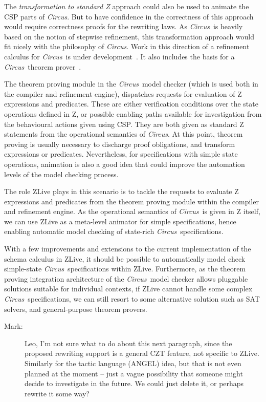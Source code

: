 \documentclass{llncs}
\newcommand{\Circus}{{\sf\slshape Circus}}
\begin{document}
    The \emph{transformation to standard Z} approach could also be
    used to animate the CSP parts of \Circus.  But to have confidence
    in the correctness of this approach would require correctness proofs
    for the rewriting laws.
    As \Circus\ is heavily based on the notion of stepwise refinement,
    this transformation approach would fit nicely with the philosophy of \Circus.
    Work in this direction of a refinement calculus for \Circus\ is under
    development~\cite{circus.ref:marcel}. It also includes the basis for a
    \Circus\ theorem prover~\cite{circus.sem:pp}.

    The theorem proving module in the \Circus\ model checker (which is
    used both in the compiler and refinement engine), dispatches
    requests for evaluation of Z expressions and predicates. These are
    either verification conditions over the state operations defined
    in Z, or possible enabling paths available for investigation from
    the behavioural actions given using CSP.  They are both given as
    standard Z statements from the operational semantics of \Circus.
    At this point, theorem proving is usually necessary to discharge
    proof obligations, and transform expressions or
    predicates. Nevertheless, for specifications with simple state
    operations, animation is also a good idea that could improve the
    automation levels of the model checking process.

    The role ZLive plays in this scenario is to tackle the requests to
    evaluate Z expressions and predicates from the theorem proving module
    within the compiler and refinement engine.  As the operational semantics of
    \Circus\ is given in Z itself, we can use ZLive as a meta-level
    animator for simple specifications, hence enabling automatic model
    checking of state-rich \Circus\ specifications.

    With a few improvements and extensions to the current implementation of
    the schema calculus in ZLive, it should be possible to automatically
    model check simple-state \Circus\ specifications within ZLive.
    Furthermore, as the theorem proving integration architecture of the
    \Circus\ model checker allows pluggable solutions suitable for individual
    contexts, if ZLive cannot handle some complex \Circus\ specifications,
    we can still resort to some alternative solution such as SAT solvers,
    and general-purpose theorem provers.

    \begin{description}
    \item[Mark:] Leo, I'm not sure what to do about this next paragraph, since
    the proposed rewriting support is a general CZT feature, not specific
    to ZLive.  Similarly for the tactic language (ANGEL) idea, but that
    is not even planned at the moment -- just a vague possibility that 
    someone might decide to investigate in the future.  We could just
    delete it, or perhaps rewrite it some way?
    \end{description}
\end{document}
